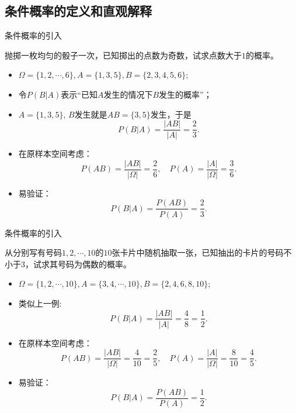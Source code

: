 \documentclass[Prob-All.tex]{subfiles}
\begin{document}
\subsection{条件概率的定义和直观解释}%
\begin{frame}{条件概率的引入}
	\begin{exam}
		抛掷一枚均匀的骰子一次，已知掷出的点数为奇数，试求点数大于$1$的概率。
	\end{exam}
	\pause

	\vspace{0.2cm}

		\begin{itemize}[<+-|alert@+>]
			\item $\Omega=\{1,2,\cdots,6\}, A=\{1,3,5\}, B=\{2,3,4,5,6\}$;
			\item 令$P(B|A)$表示“已知$A$发生的情况下$B$发生的概率”；%
			\item $A=\{1,3,5\}$, \pause $B$发生就是$AB=\{3,5\}$发生，于是
			$$P(B|A)=\frac{|AB|}{|A|}=\frac{2}{3}.$$\pause
			\item 在原样本空间考虑：
			$$P(AB)=\frac{|AB|}{|\Omega|}=\frac{2}{6},\quad P(A)=\frac{|A|}{|\Omega|}=\frac{3}{6}.$$
			\item 易验证：$$P(B|A)=\frac{P(AB)}{P(A)}=\frac{2}{3}.$$
		\end{itemize}

\end{frame}

\begin{frame}{条件概率的引入}
	\begin{exam}
		从分别写有号码$1,2,\cdots,10$的$10$张卡片中随机抽取一张，已知抽出的卡片的号码不小于$3$，试求其号码为偶数的概率。
	\end{exam}
	\pause
	\vspace{0.2cm}

		\begin{itemize}[<+-|alert@+>]
			\item $\Omega=\{1,2,\cdots,10\}, A=\{3,4,\cdots,10\}, B=\{2,4,6,8,10\}$;
			\item 类似上一例:
			$$P(B|A)=\frac{|AB|}{|A|}=\frac{4}{8}=\frac{1}{2}.$$
			\item 在原样本空间考虑：
			$$P(AB)=\frac{|AB|}{|\Omega|}=\frac{4}{10}=\frac{2}{5},\quad P(A)=\frac{|A|}{|\Omega|}=\frac{8}{10}=\frac{4}{5}.$$
			\item 易验证：$$P(B|A)=\frac{P(AB)}{P(A)}=\frac{1}{2}.$$
		\end{itemize}

\end{frame}
\end{document}
